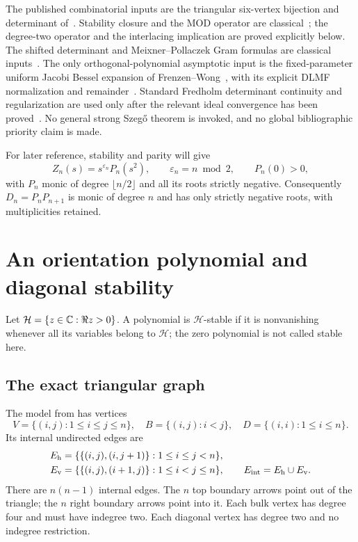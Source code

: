 \documentclass[11pt,letterpaper]{article}
\theoremstyle{remark}\newtheorem{remark}[theorem]{Remark}
\newcommand{\eps}{\varepsilon}\newcommand{\HH}{\mathcal H}\newcommand{\one}{\mathbf1}
\begin{document}
The published combinatorial inputs are the triangular six-vertex
bijection and determinant of~\cite{bfk}. Stability closure and the
MOD operator are classical~\cite{bb1,bb2}; the degree-two operator and
the interlacing implication are proved explicitly below. The shifted
determinant and Meixner--Pollaczek Gram formulas are classical
inputs~\cite{kratt,ros}. The only orthogonal-polynomial asymptotic
input is the fixed-parameter uniform Jacobi Bessel expansion of
Frenzen--Wong~\cite{fw}, with its explicit DLMF normalization and
remainder~\cite{dlmf}. Standard Fredholm determinant continuity and
regularization are used only after the relevant ideal convergence
has been proved~\cite{simon}. No general strong Szeg\H{o} theorem is
invoked, and no global bibliographic priority claim is made.

For later reference, stability and parity will give
\begin{equation}\label{dsasm:log:paritypoly}
 Z_n(s)=s^{\eps_n}P_n(s^2),\qquad
 \eps_n=n\bmod2,\qquad P_n(0)>0,
\end{equation}
with $P_n$ monic of degree $\lfloor n/2\rfloor$ and all its roots
strictly negative. Consequently $D_n=P_nP_{n+1}$ is monic of degree
$n$ and has only strictly negative roots, with multiplicities retained.

\section{An orientation polynomial and diagonal stability}
\label{dsasm:log:sec:stability}
Let $\HH=\{z\in\C:\Re z>0\}$. A polynomial is
$\HH$-stable if it is nonvanishing whenever all its variables belong
to $\HH$; the zero polynomial is not called stable here.

\subsection{The exact triangular graph}
The model from \cite[Section 5.1, Equations (5.1)--(5.2)]{bfk} has
vertices
\[
 V=\{(i,j):1\le i\le j\le n\},\quad
 B=\{(i,j):i<j\},\quad D=\{(i,i):1\le i\le n\}.
\]
Its internal undirected edges are
\begin{equation}\label{dsasm:log:edges}
\begin{split}
 E_{\rm h}&=\{\{(i,j),(i,j+1)\}:1\le i\le j<n\},\\
 E_{\rm v}&=\{\{(i,j),(i+1,j)\}:1\le i<j\le n\},
 \qquad E_{\rm int}=E_{\rm h}\cup E_{\rm v}.
\end{split}
\end{equation}
There are $n(n-1)$ internal edges. The $n$ top boundary arrows point
out of the triangle; the $n$ right boundary arrows point into it.
Each bulk vertex has degree four and must have indegree two. Each
diagonal vertex has degree two and no indegree restriction.
\end{document}
